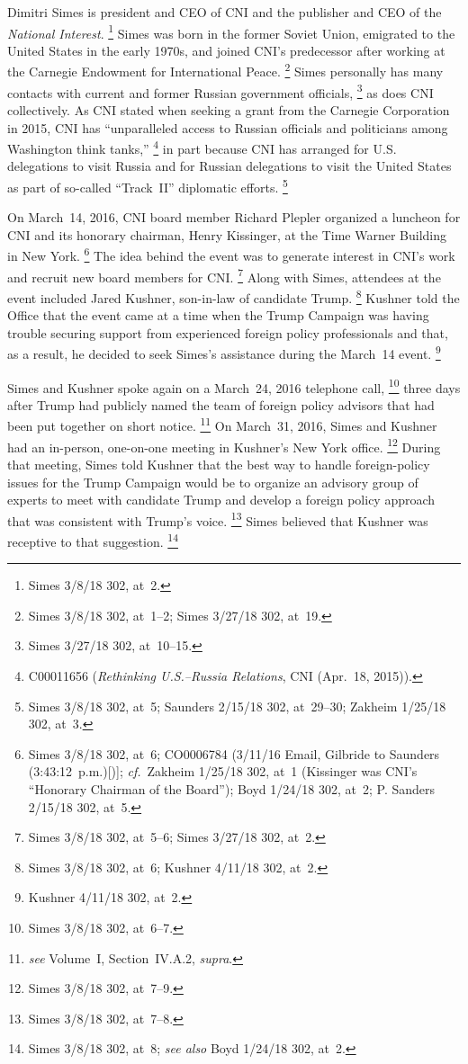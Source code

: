 Dimitri Simes is president and CEO of CNI and the publisher and CEO of the \textit{National Interest}.%
\footnote{Simes 3/8/18 302, at~2.}
Simes was born in the former Soviet Union, emigrated to the United States in the early 1970s, and joined CNI's predecessor after working at the Carnegie Endowment for International Peace.%
\footnote{ Simes 3/8/18 302, at~1--2;
Simes 3/27/18 302, at~19.}
Simes personally has many contacts with current and former Russian government officials,%
\footnote{Simes 3/27/18 302, at~10--15.}
as does CNI collectively.
As CNI stated when seeking a grant from the Carnegie Corporation in 2015, CNI has ``unparalleled access to Russian officials and politicians among Washington think tanks,''%
\footnote{C00011656 (\textit{Rethinking U.S.--Russia Relations}, CNI (Apr.~18, 2015)).}
in part because CNI has arranged for U.S. delegations to visit Russia and for Russian delegations to visit the United States as part of so-called ``Track~II'' diplomatic efforts.%
\footnote{Simes 3/8/18 302, at~5;
Saunders 2/15/18 302, at~29--30;
Zakheim 1/25/18 302, at~3.}

On March~14, 2016, CNI board member Richard Plepler organized a luncheon for CNI and its honorary chairman, Henry Kissinger, at the Time Warner Building in New York.%
\footnote{Simes 3/8/18 302, at~6;
CO0006784 (3/11/16 Email, Gilbride to Saunders (3:43:12~p.m.)[)];
\textit{cf.}~Zakheim 1/25/18 302, at~1 (Kissinger was CNI's ``Honorary Chairman of the Board'');
Boyd 1/24/18 302, at~2;
P. Sanders 2/15/18 302, at~5.}
The idea behind the event was to generate interest in CNI's work and recruit new board members for CNI\null.%
\footnote{Simes 3/8/18 302, at~5--6; Simes 3/27/18 302, at~2.}
Along with Simes, attendees at the event included Jared Kushner, son-in-law of candidate Trump.%
\footnote{Simes 3/8/18 302, at~6; Kushner 4/11/18 302, at~2.}
Kushner told the Office that the event came at a time when the Trump Campaign was having trouble securing support from experienced foreign policy professionals and that, as a result, he decided to seek Simes's assistance during the March~14 event.%
\footnote{Kushner 4/11/18 302, at~2.}

Simes and Kushner spoke again on a March~24, 2016 telephone call,%
\footnote{Simes 3/8/18 302, at~6--7.}
three days after Trump had publicly named the team of foreign policy advisors that had been put together on short notice.%
\footnote{ \textit{see} Volume~I, Section~IV.A.2, \textit{supra}.}
On March~31, 2016, Simes and Kushner had an in-person, one-on-one meeting in Kushner's New York office.%
\footnote{Simes 3/8/18 302, at~7--9.}
During that meeting, Simes told Kushner that the best way to handle foreign-policy issues for the Trump Campaign would be to organize an advisory group of experts to meet with candidate Trump and develop a foreign policy approach that was consistent with Trump's voice.%
\footnote{Simes 3/8/18 302, at~7--8.}
Simes believed that Kushner was receptive to that suggestion.%
\footnote{Simes 3/8/18 302, at~8;
\textit{see also} Boyd 1/24/18 302, at~2.}

